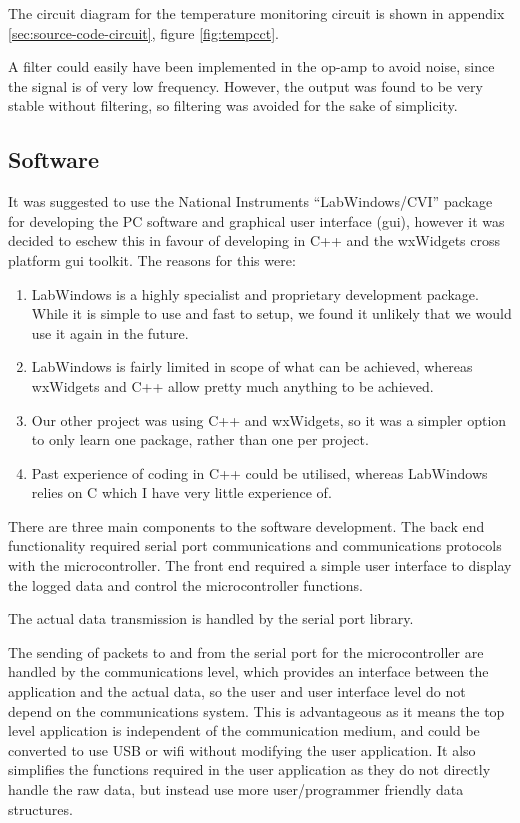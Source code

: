 \documentclass[a4paper,10pt]{article}  %
\begin{document}
The circuit diagram for the temperature monitoring circuit is shown in
appendix \ref{sec:source-code-circuit}, figure \ref{fig:tempcct}.

A filter could easily have been implemented in the op-amp to avoid
noise, since the signal is of very low frequency. However, the output
was found to be very stable without filtering, so filtering was
avoided for the sake of simplicity.

\subsection{Software}
\label{sec:software}

It was suggested to use the National Instruments ``LabWindows/CVI''
package for developing the PC software and graphical user interface
(gui), however it was decided to eschew this in favour of developing
in C++ and the wxWidgets cross platform gui toolkit. The reasons for
this were:
\begin{enumerate}
\item LabWindows is a highly specialist and proprietary development
  package. While it is simple to use and fast to setup, we found it
  unlikely that we would use it again in the future.
\item LabWindows is fairly limited in scope of what can be achieved,
  whereas wxWidgets and C++ allow pretty much anything to be achieved.
\item Our other project was using C++ and wxWidgets, so it was a
  simpler option to only learn one package, rather than one per project.
\item Past experience of coding in C++ could be utilised, whereas
  LabWindows relies on C which I have very little experience of.
\end{enumerate}

There are three main components to the software development. The
back end functionality required serial port communications and
communications protocols with the microcontroller. The front end required a simple
user interface to display the logged data and control the
microcontroller functions.

The actual data transmission is handled by the serial port
library.

The sending of packets to and from the serial port for the
microcontroller are handled by the communications level, which
provides an interface between the application and the actual data, so
the user and user interface level do not depend on the communications
system. This is advantageous as it means the top level application is
independent of the communication medium, and could be converted to use
USB or wifi without modifying the user application. It also simplifies
the functions required in the user application as they do not directly
handle the raw data, but instead use more user/programmer friendly
data structures.
\end{document}
